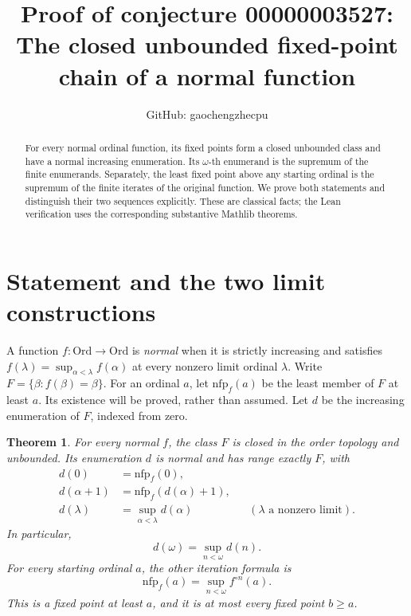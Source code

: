 \documentclass[11pt]{article}
\title{Proof of conjecture 00000003527:\\The closed unbounded fixed-point chain of a normal function}
\author{GitHub: gaochengzhecpu}
\date{}
\newtheorem{theorem}{Theorem}
\newcommand{\Ord}{\mathrm{Ord}}
\newcommand{\nfp}{\mathrm{nfp}}
\begin{document}
\maketitle

\begin{abstract}
For every normal ordinal function, its fixed points form a closed unbounded
class and have a normal increasing enumeration. Its $\omega$-th enumerand is
the supremum of the finite enumerands. Separately, the least fixed point
above any starting ordinal is the supremum of the finite iterates of the
original function. We prove both statements and distinguish their two
sequences explicitly. These are classical facts; the Lean verification
uses the corresponding substantive Mathlib theorems.
\end{abstract}

\section*{Statement and the two limit constructions}
A function $f:\Ord\to\Ord$ is \emph{normal} when it is strictly increasing
and satisfies $f(\lambda)=\sup_{\alpha<\lambda}f(\alpha)$ at every nonzero
limit ordinal $\lambda$. Write $F=\{\beta:f(\beta)=\beta\}$.
For an ordinal $a$, let $\nfp_f(a)$ be the least member of $F$ at least $a$.
Its existence will be proved, rather than assumed. Let $d$ be the increasing
enumeration of $F$, indexed from zero.

\begin{theorem}\label{thm:main}
For every normal $f$, the class $F$ is closed in the order topology and
unbounded. Its enumeration $d$ is normal and has range exactly $F$, with
\begin{align*}
 d(0)&=\nfp_f(0),\\
 d(\alpha+1)&=\nfp_f(d(\alpha)+1),\\
 d(\lambda)&=\sup_{\alpha<\lambda}d(\alpha)
       &&(\lambda\text{ a nonzero limit}).
\end{align*}
In particular,
\begin{equation}\label{eq:enum}
 d(\omega)=\sup_{n<\omega}d(n).
\end{equation}
For every starting ordinal $a$, the other iteration formula is
\begin{equation}\label{eq:iterate}
 \nfp_f(a)=\sup_{n<\omega}f^{\circ n}(a).
\end{equation}
This is a fixed point at least $a$, and it is at most every fixed point
$b\geq a$.
\end{theorem}
\end{document}
